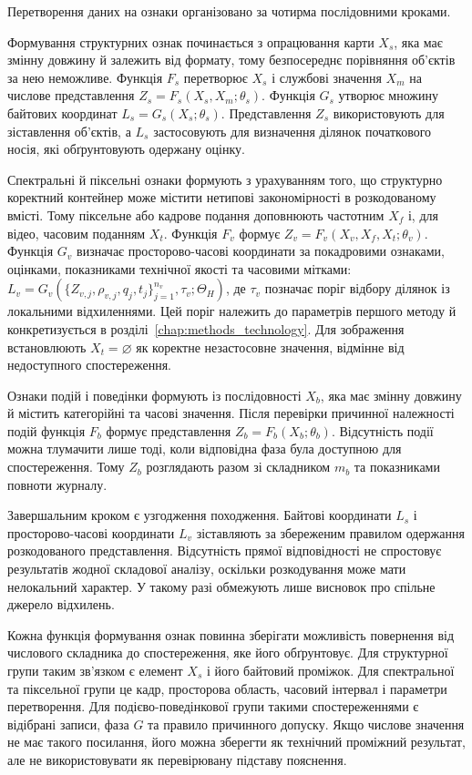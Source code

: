 Перетворення даних на ознаки організовано за чотирма послідовними кроками.

Формування структурних ознак починається з опрацювання карти $X_s$, яка має змінну довжину й залежить від формату, тому безпосереднє порівняння об’єктів за нею неможливе. Функція $F_s$ перетворює $X_s$ і службові значення $X_m$ на числове представлення $Z_s=F_s(X_s,X_m;\theta_s)$. Функція $G_s$ утворює множину байтових координат $L_s=G_s(X_s;\theta_s)$. Представлення $Z_s$ використовують для зіставлення об’єктів, а $L_s$ застосовують для визначення ділянок початкового носія, які обґрунтовують одержану оцінку.

Спектральні й піксельні ознаки формують з урахуванням того, що структурно коректний контейнер може містити нетипові закономірності в розкодованому вмісті. Тому піксельне або кадрове подання доповнюють частотним $X_f$ і, для відео, часовим поданням $X_t$. Функція $F_v$ формує $Z_v=F_v(X_v,X_f,X_t;\theta_v)$. Функція $G_v$ визначає просторово-часові координати за покадровими ознаками, оцінками, показниками технічної якості та часовими мітками: $L_v=G_v(\{Z_{v,j},\rho_{v,j},q_j,t_j\}_{j=1}^{n_v},\tau_v;\Theta_H)$, де $\tau_v$ позначає поріг відбору ділянок із локальними відхиленнями. Цей поріг належить до параметрів першого методу й конкретизується в розділі~\ref{chap:methods_technology}. Для зображення встановлюють $X_t=\varnothing$ як коректне незастосовне значення, відмінне від недоступного спостереження.

Ознаки подій і поведінки формують із послідовності $X_b$, яка має змінну довжину й містить категорійні та часові значення. Після перевірки причинної належності подій функція $F_b$ формує представлення $Z_b=F_b(X_b;\theta_b)$. Відсутність події можна тлумачити лише тоді, коли відповідна фаза була доступною для спостереження. Тому $Z_b$ розглядають разом зі складником $m_b$ та показниками повноти журналу.

Завершальним кроком є узгодження походження. Байтові координати $L_s$ і просторово-часові координати $L_v$ зіставляють за збереженим правилом одержання розкодованого представлення. Відсутність прямої відповідності не спростовує результатів жодної складової аналізу, оскільки розкодування може мати нелокальний характер. У такому разі обмежують лише висновок про спільне джерело відхилень.

Кожна функція формування ознак повинна зберігати можливість повернення від числового складника до спостереження, яке його обґрунтовує. Для структурної групи таким зв’язком є елемент $X_s$ і його байтовий проміжок. Для спектральної та піксельної групи це кадр, просторова область, часовий інтервал і параметри перетворення. Для подієво-поведінкової групи такими спостереженнями є відібрані записи, фаза $G$ та правило причинного допуску. Якщо числове значення не має такого посилання, його можна зберегти як технічний проміжний результат, але не використовувати як перевірювану підставу пояснення.

